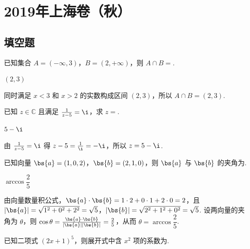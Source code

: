 \chapter{2019年上海卷（秋）}

\section{填空题}

\begin{problem}
已知集合 \(A=(-\infty,3)\)，\(B=(2,+\infty)\)，则 \(A\cap B=\)\fillinblank{}.
\end{problem}

\begin{answer}
\((2,3)\)
\end{answer}

\begin{solution}
同时满足 \(x<3\) 和 \(x>2\) 的实数构成区间 \((2,3)\)，所以 \(A\cap B=(2,3)\).
\end{solution}

\begin{problem}
已知 \(z\in\mathbb{C}\) 且满足 \(\frac1{z-5}=\i\)，求 \(z=\)\fillinblank{}.
\end{problem}

\begin{answer}
\(5-\i\)
\end{answer}

\begin{solution}
由 \(\frac1{z-5}=\i\) 得 \(z-5=\frac1{\i}=-\i\)，所以 \(z=5-\i\).
\end{solution}

\begin{problem}
已知向量 \(\bs{a}=(1,0,2)\)，\(\bs{b}=(2,1,0)\)，则 \(\bs{a}\) 与 \(\bs{b}\) 的夹角为\fillinblank{}.
\end{problem}

\begin{answer}
\(\arccos\dfrac{2}{5}\)
\end{answer}

\begin{solution}
由向量数量积公式，\(\bs{a}\cdot\bs{b}=1\cdot2+0\cdot1+2\cdot0=2\)，且 \(|\bs{a}|=\sqrt{1^2+0^2+2^2}=\sqrt5\)，\(|\bs{b}|=\sqrt{2^2+1^2+0^2}=\sqrt5\). 设两向量的夹角为 \(\theta\)，则 \(\cos\theta=\frac{\bs{a}\cdot\bs{b}}{|\bs{a}||\bs{b}|}=\frac25\)，从而 \(\theta=\arccos\dfrac25\).
\end{solution}

\begin{problem}
已知二项式 \((2x+1)^5\)，则展开式中含 \(x^2\) 项的系数为\fillinblank{}.
\end{problem}

